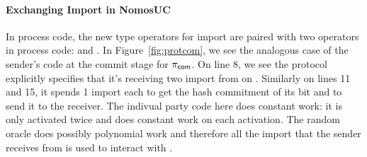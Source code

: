 \paragraph{Exchanging Import in NomosUC}
In process code, the new type operators for import are paired with two operators in process code: \ipay and \iget.
In Figure~\ref{fig:protcom}, we see the analogous case of the sender's code at the commit stage for $\pi_{\mathsf{com}}$. 
On line 8, we see the protocol explicitly specifies that it's receiving two import from \Z on .
Similarly on lines 11 and 15, it spends 1 import each to get the hash commitment of its bit and to send it to the receiver.
The indivual party code here does constant work: it is only activated twice and does constant work on each activation.
The random oracle does possibly polynomial work and therefore all the import that the sender receives from \Z is used to interact with \Fro.

%


